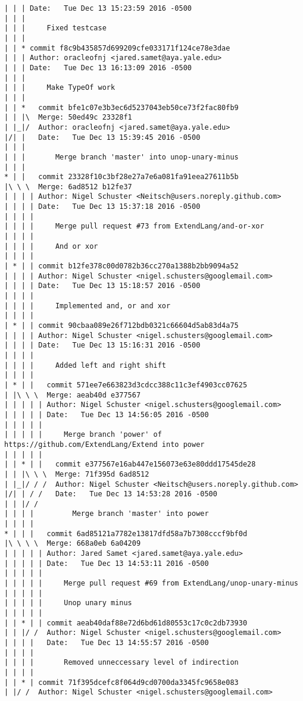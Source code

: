\begin{lstlisting}
| | | Date:   Tue Dec 13 15:23:59 2016 -0500
| | | 
| | |     Fixed testcase
| | |    
| | * commit f8c9b435857d699209cfe033171f124ce78e3dae
| | | Author: oracleofnj <jared.samet@aya.yale.edu>
| | | Date:   Tue Dec 13 16:13:09 2016 -0500
| | | 
| | |     Make TypeOf work
| | |      
| | *   commit bfe1c07e3b3ec6d5237043eb50ce73f2fac80fb9
| | |\  Merge: 50ed49c 23328f1
| |_|/  Author: oracleofnj <jared.samet@aya.yale.edu>
|/| |   Date:   Tue Dec 13 15:39:45 2016 -0500
| | |   
| | |       Merge branch 'master' into unop-unary-minus
| | |      
* | |   commit 23328f10c3bf28e27a7e6a081fa91eea27611b5b
|\ \ \  Merge: 6ad8512 b12fe37
| | | | Author: Nigel Schuster <Neitsch@users.noreply.github.com>
| | | | Date:   Tue Dec 13 15:37:18 2016 -0500
| | | | 
| | | |     Merge pull request #73 from ExtendLang/and-or-xor
| | | |     
| | | |     And or xor
| | | |     
| * | | commit b12fe378c00d0782b36cc270a1388b2bb9094a52
| | | | Author: Nigel Schuster <nigel.schusters@googlemail.com>
| | | | Date:   Tue Dec 13 15:18:57 2016 -0500
| | | | 
| | | |     Implemented and, or and xor
| | | |     
| * | | commit 90cbaa089e26f712bdb0321c66604d5ab83d4a75
| | | | Author: Nigel Schuster <nigel.schusters@googlemail.com>
| | | | Date:   Tue Dec 13 15:16:31 2016 -0500
| | | | 
| | | |     Added left and right shift
| | | |       
| * | |   commit 571ee7e663823d3cdcc388c11c3ef4903cc07625
| |\ \ \  Merge: aeab40d e377567
| | | | | Author: Nigel Schuster <nigel.schusters@googlemail.com>
| | | | | Date:   Tue Dec 13 14:56:05 2016 -0500
| | | | | 
| | | | |     Merge branch 'power' of https://github.com/ExtendLang/Extend into power
| | | | |        
| | * | |   commit e377567e16ab447e156073e63e80ddd17545de28
| | |\ \ \  Merge: 71f395d 6ad8512
| |_|/ / /  Author: Nigel Schuster <Neitsch@users.noreply.github.com>
|/| | / /   Date:   Tue Dec 13 14:53:28 2016 -0500
| | |/ /    
| | | |         Merge branch 'master' into power
| | | |       
* | | |   commit 6ad85121a7782e13817dfd58a7b7308cccf9bf0d
|\ \ \ \  Merge: 668a0eb 6a04209
| | | | | Author: Jared Samet <jared.samet@aya.yale.edu>
| | | | | Date:   Tue Dec 13 14:53:11 2016 -0500
| | | | | 
| | | | |     Merge pull request #69 from ExtendLang/unop-unary-minus
| | | | |     
| | | | |     Unop unary minus
| | | | |      
| | * | | commit aeab40daf88e72d6bd61d80553c17c0c2db73930
| | |/ /  Author: Nigel Schuster <nigel.schusters@googlemail.com>
| | | |   Date:   Tue Dec 13 14:55:57 2016 -0500
| | | |   
| | | |       Removed unneccessary level of indirection
| | | |     
| | * | commit 71f395dcefc8f064d9cd0700da3345fc9658e083
| |/ /  Author: Nigel Schuster <nigel.schusters@googlemail.com>

\end{lstlisting}
